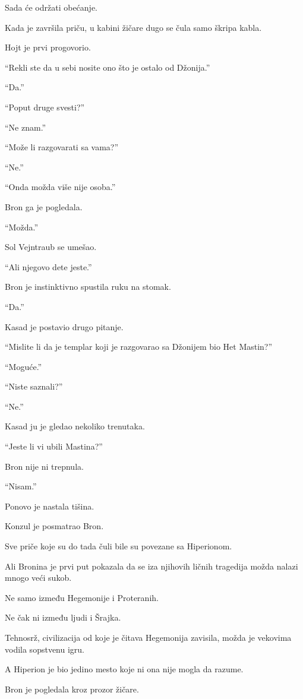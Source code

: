 Sada će održati obećanje.

\bigskip

Kada je završila priču, u kabini žičare dugo se čula samo škripa kabla.

Hojt je prvi progovorio.

``Rekli ste da u sebi nosite ono što je ostalo od Džonija.''

``Da.''

``Poput druge svesti?''

``Ne znam.''

``Može li razgovarati sa vama?''

``Ne.''

``Onda možda više nije osoba.''

Bron ga je pogledala.

``Možda.''

Sol Vejntraub se umešao.

``Ali njegovo dete jeste.''

Bron je instinktivno spustila ruku na stomak.

``Da.''

Kasad je postavio drugo pitanje.

``Mislite li da je templar koji je razgovarao sa Džonijem bio Het Mastin?''

``Moguće.''

``Niste saznali?''

``Ne.''

Kasad ju je gledao nekoliko trenutaka.

``Jeste li vi ubili Mastina?''

Bron nije ni trepnula.

``Nisam.''

Ponovo je nastala tišina.

Konzul je posmatrao Bron.

Sve priče koje su do tada čuli bile su povezane sa Hiperionom.

Ali Bronina je prvi put pokazala da se iza njihovih ličnih tragedija možda nalazi mnogo veći sukob.

Ne samo između Hegemonije i Proteranih.

Ne čak ni između ljudi i Šrajka.

Tehnosrž, civilizacija od koje je čitava Hegemonija zavisila, možda je vekovima vodila sopstvenu igru.

A Hiperion je bio jedino mesto koje ni ona nije mogla da razume.

Bron je pogledala kroz prozor žičare.

